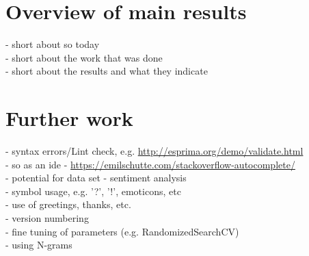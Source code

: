 \label{chap:chapter6}

\section{Overview of main results}
\label{sec:main_results}
- short about \gls{so} today \\
- short about the work that was done \\
- short about the results and what they indicate  \\


\section{Further work}
\label{sec:further_work}
- syntax errors/Lint check, e.g. \url{http://esprima.org/demo/validate.html} \\
- \gls{so} as an \gls{ide} - \url{https://emilschutte.com/stackoverflow-autocomplete/} \\
- potential for data set
- sentiment analysis \\
- symbol usage, e.g. '?', '!', emoticons, etc \\
- use of greetings, thanks, etc. \\
- version numbering \\
- fine tuning of parameters (e.g. RandomizedSearchCV) \\
- using N-grams


\begin{comment}

If these are'nt relevant, just remove them

\textcite{Stanley2013} - Predicting Tags for StackOverflow Posts

\textcite{Short2014} - Tag Recommendations in StackOverflow

\textcite{Wang2013} - An Empirical Study on Developer Interactions in StackOverflow
\end{comment}

